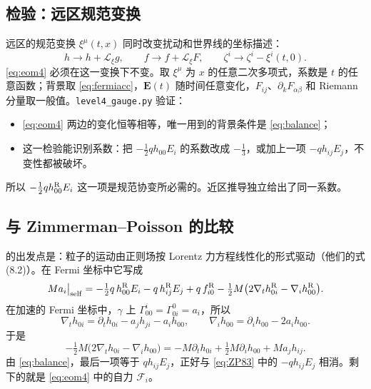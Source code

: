 \documentclass[11pt,a4paper]{ctexart}
\numberwithin{equation}{section}
\begin{document}
\subsection{检验：远区规范变换}
\label{sec:L4gauge}

远区的规范变换 $\xi^\mu(t,x)$ 同时改变扰动和世界线的坐标描述：
\begin{equation*}
h\to h+\mathcal L_\xi g,\qquad f\to f+\mathcal L_\xi F,\qquad \zeta^i\to\zeta^i-\xi^i(t,0).
\end{equation*}
\eqref{eq:eom4} 必须在这一变换下不变。取 $\xi^\mu$ 为 $x$ 的任意二次多项式，系数是 $t$ 的任意函数；背景取 \eqref{eq:fermiacc}，$\boldsymbol E(t)$ 随时间任意变化，$F_{ij}$、$\partial_kF_{\alpha\beta}$ 和 Riemann 分量取一般值。\texttt{level4\_gauge.py} 验证：
\begin{itemize}
\item \eqref{eq:eom4} 两边的变化恒等相等，唯一用到的背景条件是 \eqref{eq:balance}；
\item 这一检验能识别系数：把 $-\tfrac12qh_{00}E_i$ 的系数改成 $-\tfrac13$，或加上一项 $-qh_{ij}E_j$，不变性都被破坏。
\end{itemize}
所以 $-\tfrac12qh^{\rm R}_{00}E_i$ 这一项是规范协变所必需的。近区推导独立给出了同一系数。

\subsection{与 Zimmerman--Poisson 的比较}
\label{sec:L4ZP}

\citet{ZimmermanPoisson2014} 的出发点是：粒子的运动由正则场按 Lorentz 力方程线性化的形式驱动（他们的式 (8.2)）。在 Fermi 坐标中它写成
\begin{equation}
Ma_i\big|_{\rm self}=-\tfrac12q\,h^{\rm R}_{00}E_i-q\,h^{\rm R}_{ij}E_j+q\,f^{\rm R}_{i0}-\tfrac12M\big(2\nabla_th^{\rm R}_{0i}-\nabla_ih^{\rm R}_{00}\big).
\label{eq:ZP83}
\end{equation}
在加速的 Fermi 坐标中，$\gamma$ 上 $\Gamma^i_{00}=\Gamma^0_{0i}=a_i$，所以
\begin{equation*}
\nabla_th_{0i}=\partial_th_{0i}-a_jh_{ji}-a_ih_{00},\qquad \nabla_ih_{00}=\partial_ih_{00}-2a_ih_{00}.
\end{equation*}
于是
\begin{equation*}
-\tfrac12M\big(2\nabla_th_{0i}-\nabla_ih_{00}\big)=-M\partial_th_{0i}+\tfrac12M\partial_ih_{00}+Ma_jh_{ij}.
\end{equation*}
由 \eqref{eq:balance}，最后一项等于 $qh_{ij}E_j$，正好与 \eqref{eq:ZP83} 中的 $-qh_{ij}E_j$ 相消。剩下的就是 \eqref{eq:eom4} 中的自力 $\mathcal F_i$。
\end{document}
